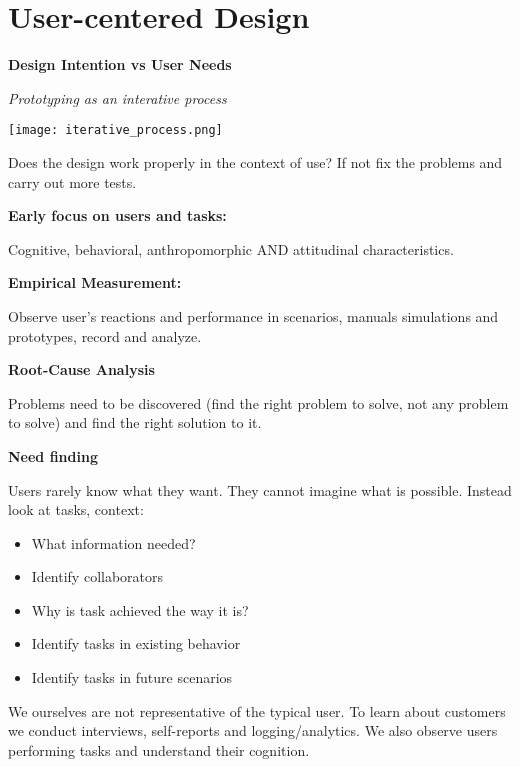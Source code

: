 \section{User-centered Design}


\textbf{Design Intention vs User Needs}

\textit{Prototyping as an interative process}

\begin{center}
	\texttt{[image: iterative\_process.png]}
\end{center}
Does the design work properly in the context of use? If not fix the problems and carry out more tests. \medskip

\textbf{Early focus on users and tasks:} \smallskip

Cognitive, behavioral, anthropomorphic AND attitudinal characteristics. \medskip

\textbf{Empirical Measurement:} \smallskip

Observe user's reactions and performance in scenarios, manuals simulations and prototypes, record and analyze. \medskip

\textbf{Root-Cause Analysis} \smallskip

Problems need to be discovered (find the right problem to solve, not any problem to solve) and find the right solution to it. \medskip

\textbf{Need finding} \smallskip

Users rarely know what they want. They cannot imagine what is possible. Instead look at tasks, context: 

\begin{multicols}{2}
    \begin{itemize}[itemsep=-5pt, topsep=-20pt, leftmargin=*]
	\item What information needed?
	\item Identify collaborators
	\item Why is task achieved the way it is?
	\item Identify tasks in existing behavior
	\item Identify tasks in future scenarios
	\end{itemize}
\end{multicols}

We ourselves are not representative of the typical user. To learn about customers we conduct interviews, self-reports and logging/analytics.
We also observe users performing tasks and understand their cognition. \medskip

